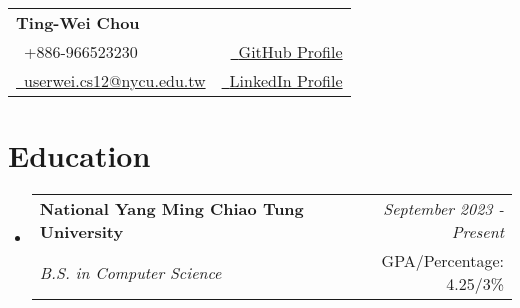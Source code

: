 \documentclass[a4paper,11pt]{article}
\makeatletter
\newcommand{\resumeSubheading}[4]{
\vspace{0.5mm}\item
    \begin{tabular*}{0.98\textwidth}[t]{l@{\extracolsep{\fill}}r}
        \textbf{#1} & \textit{\footnotesize{#4}} \\
        \textit{\footnotesize{#3}} &  \footnotesize{#2}\\
    \end{tabular*}
    \vspace{-2.4mm}
}
\newcommand{\resumeSubHeadingListStart}{\begin{itemize}[leftmargin=*,labelsep=0mm]}
\newcommand{\resumeItemListStart}{\begin{justify}\begin{itemize}[leftmargin=3ex, rightmargin=2ex, noitemsep,labelsep=1.2mm,itemsep=0mm]\small}
\newcommand{\resumeSubHeadingListEnd}{\end{itemize}\vspace{2mm}}
\newcommand{\resumeItemListEnd}{\end{itemize}\end{justify}\vspace{-2mm}}
\newcommand{\name}{Ting-Wei Chou} %
\newcommand{\phone}{966523230}
\newcommand{\emaila}{userwei.cs12@nycu.edu.tw}
\makeatother
\begin{document}
\selectfont


\parbox{\dimexpr\linewidth-0.3cm\relax}{
\begin{tabularx}{\linewidth}{L r} \\
  \textbf{\Large \name} \\ 
  {\raisebox{0.0\height}{\footnotesize \faPhone}\ +886-\phone} & \href{https://github.com/chou-ting-wei}{\raisebox{0.0\height}{\footnotesize \faGithub}\ {GitHub Profile}}\\
  \href{mailto:\emaila}{\raisebox{0.0\height}{\footnotesize 
 \faEnvelope}\ {\emaila}}&\href{https://www.linkedin.com/in/userwei}{\raisebox{0.0\height}{\footnotesize \faLinkedin}\ {LinkedIn Profile}}
\end{tabularx}
}





\section{\textbf{Education}}
  \resumeSubHeadingListStart
    \resumeSubheading
      {National Yang Ming Chiao Tung University}{GPA/Percentage: 4.25/3\%}
      {B.S. in Computer Science}{September 2023 - Present}
  \resumeSubHeadingListEnd
\vspace{-5.5mm}
%



    
    
      
\end{document}
